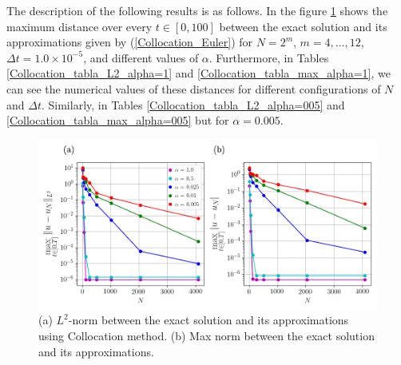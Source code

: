 	The description of the following results is as follows. In the figure \ref{Collocation_alphas} shows the maximum distance over every $t \in [0, 100]$ between the exact solution and its approximations given by (\ref{Collocation_Euler}) for $N = 2^m$, $m = 4, \dots, 12$, $\Delta t = 1.0 \times 10^{-5}$, and different values of $\alpha$. Furthermore, in Tables \ref{Collocation_tabla_L2_alpha=1} and \ref{Collocation_tabla_max_alpha=1}, we can see the numerical values ​​of these distances for different configurations of $N$ and $\Delta t$. Similarly, in Tables \ref{Collocation_tabla_L2_alpha=005} and \ref{Collocation_tabla_max_alpha=005} but for $\alpha = 0.005$.
	
	\newpage
	\begin{figure}[H]
		\centering
		\includegraphics[width=12cm]{burgers_equation/deterministic/numerical_experiments/viscid/figures/collocation/alphas_Error_N.png}
		\caption{(a) $L^2$-norm between the exact solution and its approximations using Collocation method. (b) Max norm between the exact solution and its approximations.}
		\label{Collocation_alphas}
	\end{figure}

